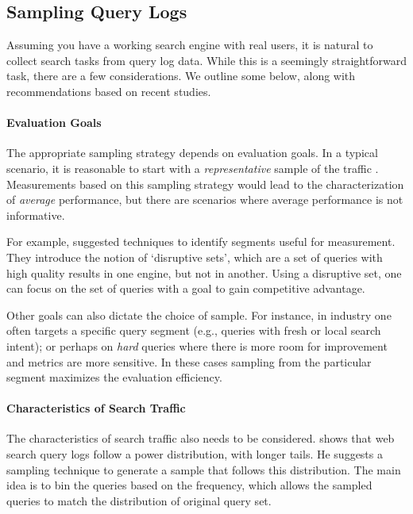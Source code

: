 \subsection{Sampling Query Logs}
Assuming you have a working search engine with real users, it is natural to collect search tasks from query log data. While this is a seemingly straightforward task, there are a few considerations. We outline some below, along with recommendations based on recent studies.

\paragraph{Evaluation Goals} The appropriate sampling strategy depends on evaluation goals. In a typical scenario, it is reasonable to start with a \textit{representative} sample of the traffic . Measurements based on this sampling strategy would lead to the characterization of \textit{average} performance, but there are scenarios where average performance is not informative. 

For example, \cite{Zaragoza:2010} suggested techniques to identify segments useful for measurement. They introduce the notion of `disruptive sets', which are a set of queries with high quality results in one engine, but not in another. Using a disruptive set, one can focus on the set of queries with a goal to gain competitive advantage.

Other goals can also dictate the choice of sample. For instance, in industry one often targets a specific query segment (e.g., queries with fresh or local search intent); or perhaps on \textit{hard} queries where there is more room for improvement and metrics are more sensitive. In these cases sampling from the particular segment maximizes the evaluation efficiency.

\paragraph{Characteristics of Search Traffic} The characteristics of search traffic also needs to be considered. \cite{Baeza-Yates:2015} shows that web search query logs follow a power distribution, with longer tails. He suggests a sampling technique to generate a sample that follows this distribution. The main idea is to bin the queries based on the frequency, which allows the sampled queries to match the distribution of original query set. 


